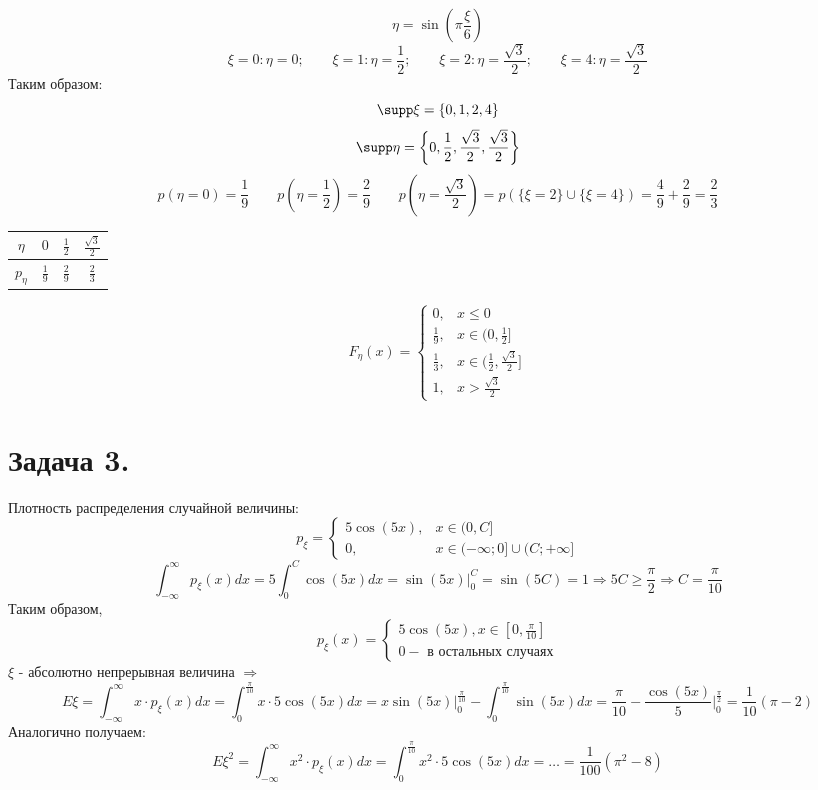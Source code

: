 \[
\eta = \sin (\pi \frac{\xi}{6})
\]
\[
\xi = 0: \eta = 0; ~~~~~~~~~ \xi = 1: \eta = \frac{1}{2}; ~~~~~~~~~ \xi = 2: \eta = \frac{\sqrt{3}}{2}; ~~~~~~~~~ \xi = 4: \eta = \frac{\sqrt{3}}{2}
\]
Таким образом:
\[
\supp \xi = \{ 0, 1, 2, 4 \}
\]
\[
\supp \eta = \left\{ 0, \frac{1}{2}, \frac{\sqrt{3}}{2}, \frac{\sqrt{3}}{2} \right\}
\]
\[
p(\eta = 0) = \frac{1}{9} ~~~~~~~~~ p\left(\eta = \frac{1}{2}\right) = \frac{2}{9} ~~~~~~~~~ p\left(\eta = \frac{\sqrt{3}}{2}\right) = p(\{\xi = 2\} \cup \{\xi = 4\}) = \frac{4}{9} + \frac{2}{9} = \frac{2}{3}
\]
\begin{table}[H]
	\centering\makegapedcells
	\begin{tabular}{|c|c|c|c|}
		\hline
		$\eta$     & $0$           & $\frac{1}{2}$ & $\frac{\sqrt{3}}{2}$ \\ \hline
		$p_{\eta}$ & $\frac{1}{9}$ & $\frac{2}{9}$ & $\frac{2}{3}$        \\ \hline
	\end{tabular}
\end{table}
\[
F_{\eta} (x) =
\begin{cases}
0, &x \le 0 \\
\frac{1}{9}, &x \in (0, \frac{1}{2}] \\
\frac{1}{3}, &x \in (\frac{1}{2}, \frac{\sqrt{3}}{2}] \\
1, &x > \frac{\sqrt{3}}{2}
\end{cases}
\]

\section*{Задача 3.}

Плотность распределения случайной величины:
\[
p_{\xi} =
\begin{cases}
5 \cos (5x), &x \in (0, C] \\
0, &x \in (-\infty; 0] \cup (C; +\infty]
\end{cases}
\]
\[
\int_{-\infty}^{\infty} p_{\xi} (x) dx = 5 \int_{0}^{C} \cos (5x) dx = \sin (5x) \bigg|_{0}^{C} = \sin(5C) = 1 \Rightarrow 5C \ge \frac{\pi}{2} \Rightarrow C = \frac{\pi}{10} 
\]
Таким образом,
\[
p_{\xi}(x) =
\begin{cases}
5 \cos (5x), x \in [0, \frac{\pi}{10}] \\
0 - \text{ в остальных случаях}
\end{cases}
\]
$\xi$ - абсолютно непрерывная величина $\Rightarrow$
\[
E\xi = \int_{-\infty}^{\infty} x \cdot p_{\xi} (x) dx = \int_{0}^{\frac{\pi}{10}} x \cdot 5 \cos (5x) dx = 
x \sin (5x) \bigg|_{0}^{\frac{\pi}{10}} - \int_{0}^{\frac{\pi}{10}} \sin (5x) dx = 
\frac{\pi}{10} - \frac{\cos (5x)}{5} \bigg|_{0}^{\frac{\pi}{2}} = \frac{1}{10} (\pi - 2)
\]
Аналогично получаем:
\[
E\xi^2 = \int_{-\infty}^{\infty} x^2 \cdot p_{\xi} (x) dx = \int_{0}^{\frac{\pi}{10}} x^2 \cdot 5 \cos (5x) dx = \dots =
\frac{1}{100} (\pi^2 - 8)
\]

